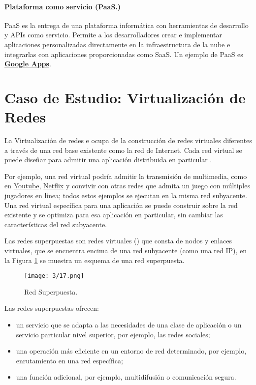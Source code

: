 { \paragraph{Plataforma como servicio (PaaS.)} PaaS es la entrega de una plataforma informática  con herramientas de desarrollo y APIs como servicio. Permite a los desarrolladores crear  e implementar aplicaciones personalizadas directamente en la infraestructura de la nube e integrarlas con aplicaciones proporcionadas como SaaS. Un ejemplo de  PaaS   es \textbf{\href{https://play.google.com/store/apps?hl=es_VE&gl=US}{Google Apps}}.
 
 \section{Caso de Estudio: Virtualización de Redes}
 \label{sec:redes-sup}
 
La Virtualización de redes  e ocupa de la construcción de  redes virtuales diferentes a través de una red base existente como la red de Internet. Cada  red virtual se puede diseñar para admitir una aplicación distribuida en particular \cite{Coulouris2011}.
 
 Por ejemplo, una red virtual podría admitir la transmisión de multimedia, como en \href{https://www.youtube.com/}{Youtube}, 
 \href{https://www.netflix.com/ve/}{Netflix}    y convivir con otras redes que admita un juego con múltiples jugadores  en línea; todos estos ejemplos se ejecutan en la misma red subyacente. Una red virtual específica para una aplicación se puede construir sobre la red existente y
 se optimiza para esa aplicación en particular, sin cambiar las características del red subyacente. 
 
 Las  \gls{redes superpuestas} son redes virtuales (\cite{Peterson2021}) que consta de nodos y enlaces virtuales, que se encuentra encima de una red subyacente (como una red IP), en la Figura \ref{fig:red-overlay} se muestra un esquema de una red superpuesta.
 
 	 \begin{figure}   
 	 	 \begin{center}%
 	\texttt{[image: 3/17.png]}
 	\caption{Red Superpuesta.}
 	\label{fig:red-overlay}
  \end{center} 
\end{figure}  
 
 
  Las redes superpuestas ofrecen:   
 \begin{itemize}
 	\item   un servicio que se adapta a las necesidades de una clase de aplicación o un servicio particular  nivel superior, por ejemplo, las redes sociales;
 	\item  una operación más eficiente en un entorno de red determinado, por ejemplo, enrutamiento en una red específica;
 	\item  una función adicional, por ejemplo, multidifusión o comunicación segura.
 \end{itemize}    
 
}

